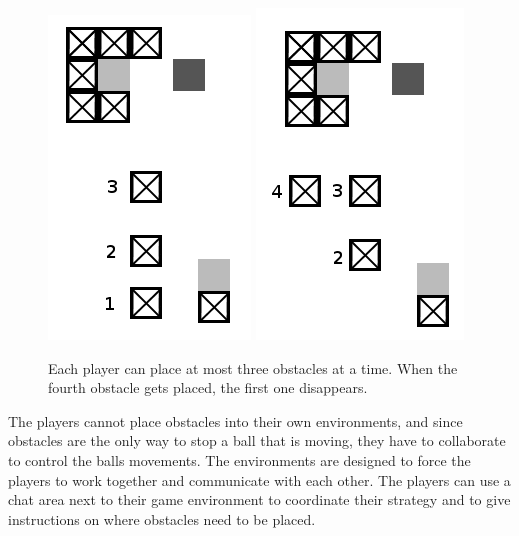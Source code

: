 \begin{figure}
\hspace*{\fill}\includegraphics[scale=0.35]{blockplacement1.png}
\hspace*{\fill}\includegraphics[scale=0.35]{blockplacement2.png}\hspace*{\fill}
\caption{Each player can place at most three obstacles at a time. When
  the fourth obstacle gets placed, the first one disappears.}
\label{fig:dropping-blocks}
\end{figure}

The players cannot place obstacles into their own environments, and
since obstacles are the only way to stop a ball that is moving, they
have to collaborate to control the balls movements. 
The environments are designed to force the players to work together
and communicate with each other.  The players can use a chat area next
to their game environment to coordinate their strategy and to give
instructions on where obstacles need to be placed.


